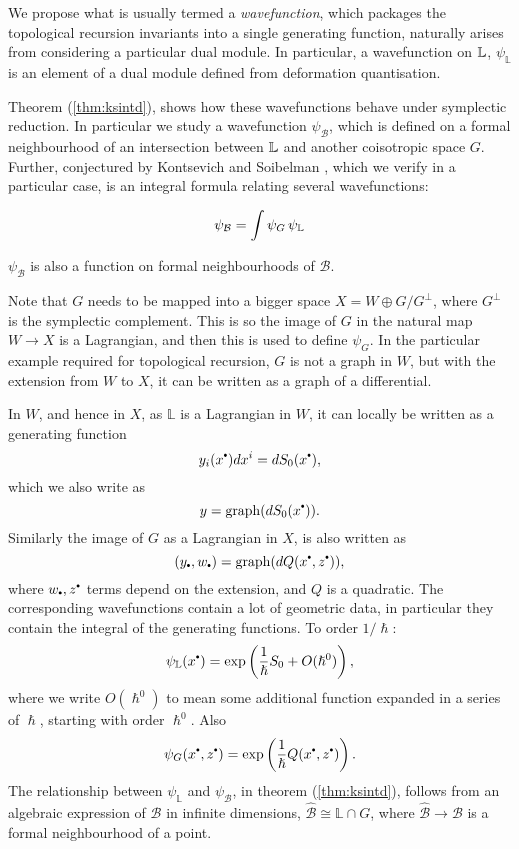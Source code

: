     We propose what is usually termed a \emph{wavefunction}, which packages the topological recursion invariants into a single generating function, naturally arises from considering a particular dual module. In particular, a wavefunction on \( \mathbb{L} \), \( \psi_{\mathbb{L}}\) is an element of a dual module defined from deformation quantisation.
    
    Theorem (\ref{thm:ksintd}), shows how these wavefunctions behave under symplectic reduction. In particular we study a wavefunction \( \psi_{\mathcal{B}}\), which is defined on a formal neighbourhood of an intersection between \(\mathbb{L}\) and another coisotropic space \(G\). Further, conjectured by Kontsevich and Soibelman \cite{ks_airy}, which we verify in a particular case, is an integral formula relating several wavefunctions:
    \begin{thm}
    \label{thm:ksintd}
    \[ \psi_{\mathcal{B}} = \int \psi_{G} \, \psi_{\mathbb{L} }\]
    \end{thm}
    \( \psi_{\mathcal{B}}\) is also a function on formal neighbourhoods of \( \mathcal{B}\).
    
    Note that \(G\) needs to be mapped into a bigger space \(X=W \oplus G/G^{\perp}\), where \(G^{\perp}\) is the symplectic complement. This is so the image of \(G\) in the natural map \(W \rightarrow X\) is a Lagrangian, and then this is used to define \( \psi_G\). In the particular example required for topological recursion, \(G\) is not a graph in \(W\), but with the extension from \(W\) to \(X\), it can be written as a graph of a differential.
    
    In \(W\), and hence in \(X\), as \(\mathbb{L}\) is a Lagrangian in \(W\), it can locally be written as a generating function \[ y_i(x^{\sbt}) dx^i = d S_{0}(x^{\sbt}), \] which we also write as \[y=\mathrm{graph}(d S_0(x^{\sbt})).\] Similarly the image of \(G\) as a Lagrangian in \(X\), is also written as \[ (y_{\sbt},w_{\sbt}) =\mathrm{graph}( d Q(x^{\sbt},z^{\sbt})),\] where \(w_{\sbt},z^{\sbt}\) terms depend on the extension, and \(Q\) is a quadratic. The corresponding wavefunctions contain a lot of geometric data, in particular they contain the integral of the generating functions. To order \( 1/\hslash\):
    \[ \psi_{\mathbb{L}}(x^{\sbt}) = \exp\left( \frac{1}{\hslash} S_0 + O(\hslash^0)\right),\]
    where we write \( O(\hslash^0) \) to mean some additional function expanded in a series of \(\hslash\), starting with order \(\hslash^0\). Also
    \[ \psi_{G}(x^{\sbt},z^{\sbt}) = \exp\left( \frac{1}{\hslash} Q(x^{\sbt},z^{\sbt}) \right).\]
    The relationship between \( \psi_{\mathbb{L}}\) and \( \psi_{\mathcal{B}}\), in theorem (\ref{thm:ksintd}), follows from an algebraic expression of \( \mathcal{B}\) in infinite dimensions, \( \widehat{\mathcal{B}} \cong \mathbb{L} \cap G\), where \( \widehat{\mathcal{B}} \rightarrow \mathcal{B}\) is a formal neighbourhood of a point. 
    
